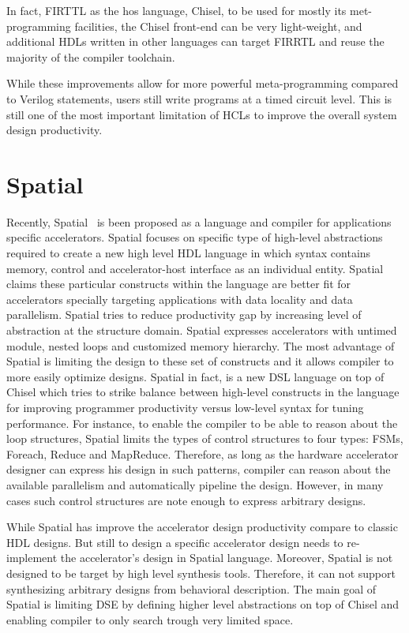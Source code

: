 In fact, FIRTTL as the hos language, Chisel, to be used for mostly its met-programming facilities, the Chisel front-end can be very light-weight, and additional HDLs written in other languages can target FIRRTL and reuse the majority of the compiler toolchain.


While these improvements allow for more powerful meta-programming compared to Verilog  statements, users still write programs at a timed circuit level. This is still one of the most important limitation of HCLs to improve the overall system design productivity.

\section{Spatial}
Recently, Spatial~\cite{david_PLDI_2018_spatial} is been proposed as a language and compiler for applications specific accelerators.
Spatial focuses on specific type of high-level abstractions required to create a new high level HDL language in which syntax contains memory, control and accelerator-host interface as an individual entity.
Spatial claims these particular constructs within the language are better fit for accelerators specially targeting applications with data locality and data parallelism.
Spatial tries to reduce productivity gap by increasing level of abstraction at the structure domain. Spatial expresses accelerators with untimed module, nested loops and customized memory hierarchy.
The most advantage of Spatial is limiting the design to these set of constructs and it allows compiler to more easily optimize designs.
Spatial in fact, is a new DSL language on top of Chisel which tries to strike balance between high-level constructs in the language for improving programmer productivity versus low-level syntax for tuning performance. 
For instance, to enable the compiler to be able to reason about the loop structures, Spatial limits the types of control structures to four types: FSMs, Foreach, Reduce and MapReduce. 
Therefore, as long as the hardware accelerator designer can express his design in such patterns, compiler can reason about the available parallelism and automatically pipeline the design.
However, in many cases such control structures are note enough to express arbitrary designs.

While Spatial has improve the accelerator design productivity compare to classic HDL designs.
But still to design a specific accelerator design needs to re-implement the accelerator's design in Spatial language. Moreover, Spatial is not designed to be target by high level synthesis tools.
Therefore, it can not support synthesizing arbitrary designs from behavioral description.
The main goal of Spatial is limiting DSE by defining higher level abstractions on top of Chisel and enabling compiler to only search trough very limited space.


